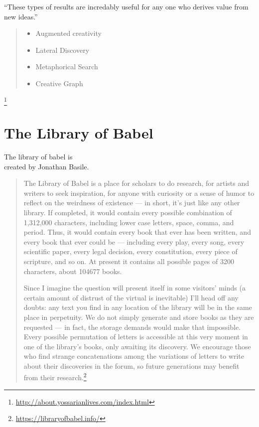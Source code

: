 ``These types of results are incredably useful for any one who derives value from new ideas.''\autocite{Yossarian2015}

\begin{quote}
\begin{itemize}
  \item Augmented creativity
  \item Lateral Discovery
  \item Metaphorical Search
  \item Creative Graph
\end{itemize}
\end{quote}\footnote{\url{http://about.yossarianlives.com/index.html}}


\section{The Library of Babel}

The library of babel is \\
created by Jonathan Basile.

\begin{quote}
  The Library of Babel is a place for scholars to do research, for artists and writers to seek inspiration, for anyone with curiosity or a sense of humor to reflect on the weirdness of existence --- in short, it’s just like any other library. If completed, it would contain every possible combination of 1,312,000 characters, including lower case letters, space, comma, and period. Thus, it would contain every book that ever has been written, and every book that ever could be --- including every play, every song, every scientific paper, every legal decision, every constitution, every piece of scripture, and so on. At present it contains all possible pages of 3200 characters, about 104677 books.

  Since I imagine the question will present itself in some visitors’ minds (a certain amount of distrust of the virtual is inevitable) I’ll head off any doubts: any text you find in any location of the library will be in the same place in perpetuity. We do not simply generate and store books as they are requested --- in fact, the storage demands would make that impossible. Every possible permutation of letters is accessible at this very moment in one of the library's books, only awaiting its discovery. We encourage those who find strange concatenations among the variations of letters to write about their discoveries in the forum, so future generations may benefit from their research.\footnote{\url{https://libraryofbabel.info/}}
\end{quote}

\stopcontents[chapters]
